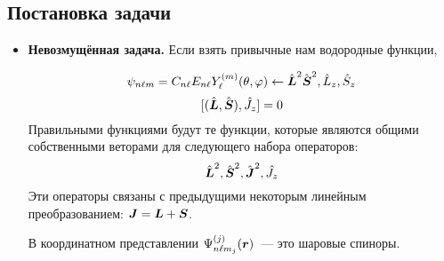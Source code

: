 \subsection{Постановка задачи}
\begin{itemize}
  \item \textbf{Невозмущённая задача.} Если взять привычные нам водородные функции,

  $$
    \psi_{n\l m} = C_{n \l} E_{n \l} Y_{\l}^{(m)} (\theta, \phi) \leftarrow \hat{\bf L}^2 \hat{\bf S}^2, \hat L_z, \hat S_z
  $$
  $$
        [(\hat{\bf L}, \hat{\bf S}), \hat J_z] = 0
  $$
  Правильными функциями будут те функции, которые являются общими собственными веторами для следующего набора операторов:
  $$
    \hat{\bf L}^2, \hat{\bf S}^2, \hat{\bf J}^2, \hat{J_z}
  $$
  Эти операторы связаны с предыдущими некоторым линейным преобразованием: $\bf J = \bf L + \bf S$.
  
  В координатном представлении $\Psi_{n\l m_j}^{(j)} (\bf r)$~--- это шаровые спиноры.
\end{itemize}
